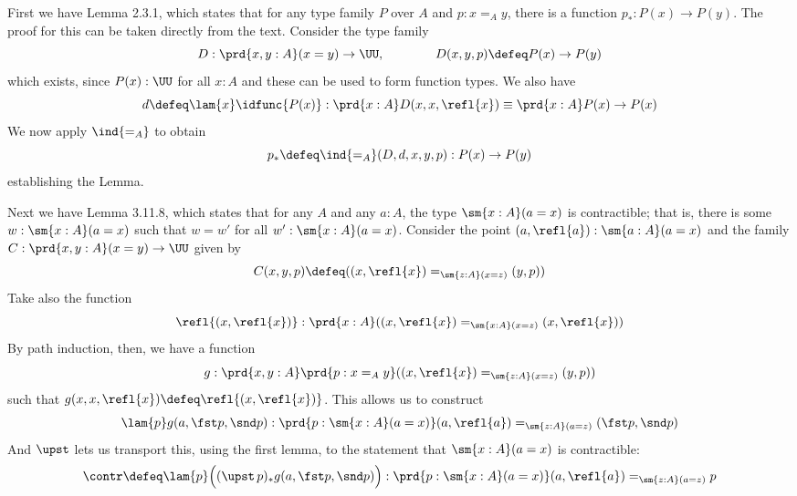 First we have Lemma 2.3.1, which states that for any type family $P$ over $A$
and $p : x =_{A} y$, there is a function $p_{*} : P(x) \to P(y)$.  The proof
for this can be taken directly from the text.  Consider the type family
\[
D : \prd{x, y : A}(x = y) \to \UU,
\qquad\qquad
D(x, y, p) \defeq P(x) \to P(y)
\]
which exists, since $P(x) : \UU$ for all $x : A$ and these can be used to form
function types.  We also have
\[
d \defeq \lam{x}\idfunc{P(x)} 
: \prd{x:A}D(x, x, \refl{x})
\equiv \prd{x:A} P(x) \to P(x)
\]
We now apply $\ind{=_{A}}$ to obtain
\[
p_{*} \defeq \ind{=_{A}}(D, d, x, y, p) : P(x) \to P(y)
\]
establishing the Lemma.


Next we have Lemma 3.11.8, which states that for any $A$ and any $a : A$, the
    type $\sm{x:A} (a = x)$ is contractible;  that is, there is some $w :
    \sm{x:A}(a=x)$ such that $w = w'$ for all $w' : \sm{x:A}(a=x)$.  Consider the
    point $(a, \refl{a}) : \sm{a:A}(a=x)$ and the family $C: \prd{x,y:A}(x=y) \to \UU$ given
    by
    \[
    C(x, y, p) \defeq 
    ((x, \refl{x}) =_{\sm{z:A}(x=z)} (y, p))
    \]
    Take also the function
    \[
    \refl{(x, \refl{x})} : \prd{x:A} ((x, \refl{x}) =_{\sm{x:A}(x=z)} (x, \refl{x}))
    \]
    By path induction, then, we have a function
    \[
    g : \prd{x, y:A}\prd{p:x =_{A} y} 
    ((x, \refl{x}) =_{\sm{z:A}(x=z)} (y, p))
    \]
    such that $g(x, x, \refl{x}) \defeq \refl{(x, \refl{x})}$.  
    This allows us to construct
    \[
    \lam{p}g(a, \fst p, \snd p) : 
    \prd{p:\sm{x:A}(a=x)}
    (a, \refl{a}) =_{\sm{z:A}(a=z)} (\fst p, \snd p)
    \]
    And $\upst$ lets us transport this, using the first lemma, to the statement
    that $\sm{x:A}(a=x)$ is contractible:
    \[
    \contr \defeq \lam{p}\Big(
    (\upst\,p)_{*}g(a, \fst p, \snd p)
    \Big)
    :
    \prd{p:\sm{x:A}(a=x)}
    (a, \refl{a}) =_{\sm{z:A}(a=z)} p
    \]


